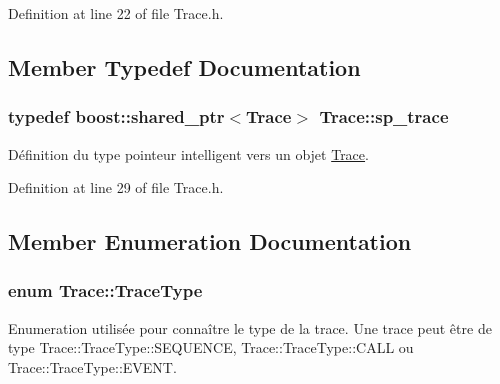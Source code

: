Definition at line 22 of file Trace.\+h.



\subsection{Member Typedef Documentation}
\subsubsection[{\texorpdfstring{sp\+\_\+trace}{sp_trace}}]{\setlength{\rightskip}{0pt plus 5cm}typedef boost\+::shared\+\_\+ptr$<${\bf Trace}$>$ {\bf Trace\+::sp\+\_\+trace}}\hypertarget{class_trace_a9c58e523529fc8a03fb6acf3eef86150}{}\label{class_trace_a9c58e523529fc8a03fb6acf3eef86150}
Définition du type pointeur intelligent vers un objet \hyperlink{class_trace}{Trace}. 

Definition at line 29 of file Trace.\+h.



\subsection{Member Enumeration Documentation}
\subsubsection[{\texorpdfstring{Trace\+Type}{TraceType}}]{\setlength{\rightskip}{0pt plus 5cm}enum {\bf Trace\+::\+Trace\+Type}}\hypertarget{class_trace_a39e5f82f2243958348cc74d7cdae527c}{}\label{class_trace_a39e5f82f2243958348cc74d7cdae527c}


Enumeration utilisée pour connaître le type de la trace. Une trace peut être de type Trace\+::\+Trace\+Type\+::\+S\+E\+Q\+U\+E\+N\+CE, Trace\+::\+Trace\+Type\+::\+C\+A\+LL ou Trace\+::\+Trace\+Type\+::\+E\+V\+E\+NT. 

